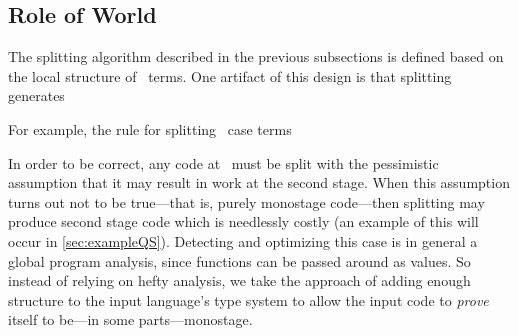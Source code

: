 \begin{abstrsyn}
\subsection {Role of World \bbonep}
\label{sec:needGround}

The splitting algorithm described in the previous subsections is
defined based on the local structure of \lang\ terms.  One artifact of
this design is that splitting generates

For example, the rule for splitting \bbonem\ case terms








In order to be correct, any code at \bbonem\ must be split with the 
pessimistic assumption that it may result in work at the second stage.
When this assumption turns out not to be true---that is, purely monostage code---then 
splitting may produce second stage code which is needlessly costly 
(an example of this will occur in \ref{sec:exampleQS}).
Detecting and optimizing this case is in general a global program analysis,
since functions can be passed around as values.  
So instead of relying on hefty analysis, 
we take the approach of adding enough structure to the input language's type system to
allow the input code to {\em prove} itself to be---in some parts---monostage.


\end{abstrsyn}



